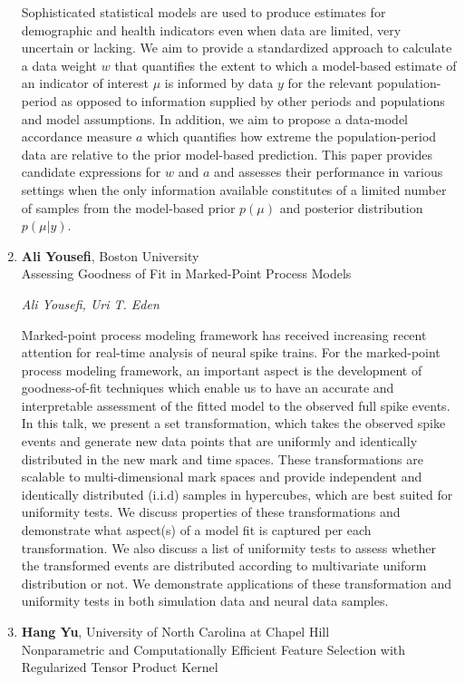 \begin{enumerate}
Sophisticated statistical models are used to produce estimates for demographic and health indicators even when data are limited, very uncertain or lacking. We aim to provide a standardized approach to calculate a data weight $w$ that quantifies the extent to which a model-based estimate of an indicator of interest $\mu$ is informed by data $y$ for the relevant population-period as opposed to information supplied by other periods and populations and model assumptions. In addition, we aim to propose a data-model accordance measure $a$ which quantifies how extreme the population-period data are relative to the prior model-based prediction. This paper provides candidate expressions for $w$ and $a$ and assesses their performance in various settings when the only information available constitutes of a limited number of samples from the model-based prior $p(\mu)$ and posterior distribution $p(\mu|y)$.

\item \textbf{Ali Yousefi}, Boston University \\
Assessing Goodness of Fit in Marked-Point Process Models

\emph{\footnotesize Ali Yousefi, Uri T. Eden}

Marked-point process modeling framework has received increasing recent attention for real-time analysis of neural spike trains. For the marked-point process modeling framework, an important aspect is the development of goodness-of-fit techniques which enable us to have an accurate and interpretable assessment of the fitted model to the observed full spike events. In this talk, we present a set transformation, which takes the observed spike events and generate new data points that are uniformly and identically distributed in the new mark and time spaces. These transformations are scalable to multi-dimensional mark spaces and provide independent and identically distributed (i.i.d) samples in hypercubes, which are best suited for uniformity tests. We discuss properties of these transformations and demonstrate what aspect(s) of a model fit is captured per each transformation. We also discuss a list of uniformity tests to assess whether the transformed events are distributed according to multivariate uniform distribution or not. We demonstrate applications of these transformation and uniformity tests in both simulation data and neural data samples.

\item \textbf{Hang Yu}, University of North Carolina at Chapel Hill \\
Nonparametric and Computationally Efficient Feature Selection with Regularized Tensor Product Kernel


\end{enumerate}
